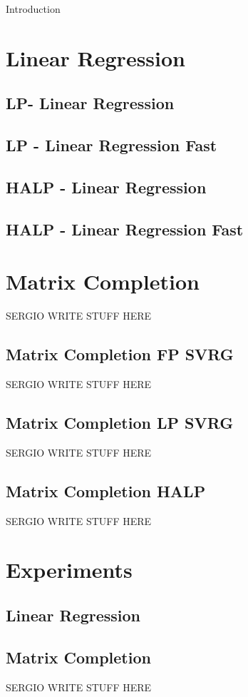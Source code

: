 \documentclass{article}
\begin{document}
Introduction 


\section{Linear Regression} 

\subsection*{LP- Linear Regression}

\subsection*{LP - Linear Regression Fast}

\subsection*{HALP - Linear Regression}

\subsection*{HALP - Linear Regression  Fast}

\section{Matrix Completion}
SERGIO WRITE STUFF HERE
\subsection*{Matrix Completion FP SVRG}
SERGIO WRITE STUFF HERE
\subsection*{Matrix Completion LP SVRG}
SERGIO WRITE STUFF HERE
\subsection*{Matrix Completion HALP}
SERGIO WRITE STUFF HERE
\section{Experiments}

\subsection*{Linear Regression}

\subsection*{Matrix Completion}
 SERGIO WRITE STUFF HERE






\end{document}
